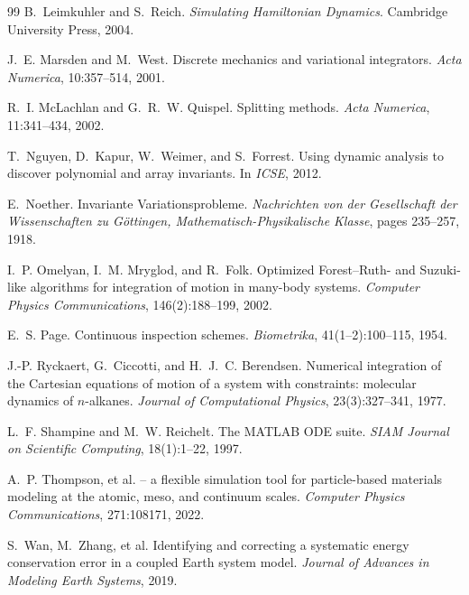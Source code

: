 \documentclass[11pt,a4paper]{article}
\begin{document}
\begin{thebibliography}{99}
B.~Leimkuhler and S.~Reich.
\newblock \emph{Simulating Hamiltonian Dynamics}.
\newblock Cambridge University Press, 2004.

J.~E. Marsden and M.~West.
\newblock Discrete mechanics and variational integrators.
\newblock \emph{Acta Numerica}, 10:357--514, 2001.

R.~I. McLachlan and G.~R.~W. Quispel.
\newblock Splitting methods.
\newblock \emph{Acta Numerica}, 11:341--434, 2002.

T.~Nguyen, D.~Kapur, W.~Weimer, and S.~Forrest.
\newblock Using dynamic analysis to discover polynomial and array invariants.
\newblock In \emph{ICSE}, 2012.

E.~Noether.
\newblock Invariante {V}ariationsprobleme.
\newblock \emph{Nachrichten von der Gesellschaft der Wissenschaften zu G\"ottingen, Mathematisch-Physikalische Klasse}, pages 235--257, 1918.

I.~P. Omelyan, I.~M. Mryglod, and R.~Folk.
\newblock Optimized {Forest--Ruth-} and {Suzuki}-like algorithms for integration of motion in many-body systems.
\newblock \emph{Computer Physics Communications}, 146(2):188--199, 2002.

E.~S. Page.
\newblock Continuous inspection schemes.
\newblock \emph{Biometrika}, 41(1--2):100--115, 1954.

J.-P. Ryckaert, G.~Ciccotti, and H.~J.~C. Berendsen.
\newblock Numerical integration of the {Cartesian} equations of motion of a system with constraints: molecular dynamics of $n$-alkanes.
\newblock \emph{Journal of Computational Physics}, 23(3):327--341, 1977.

L.~F. Shampine and M.~W. Reichelt.
\newblock The {MATLAB} {ODE} suite.
\newblock \emph{SIAM Journal on Scientific Computing}, 18(1):1--22, 1997.

A.~P. Thompson, et al.
 -- a flexible simulation tool for particle-based materials modeling at the atomic, meso, and continuum scales.
\newblock \emph{Computer Physics Communications}, 271:108171, 2022.

S.~Wan, M.~Zhang, et al.
\newblock Identifying and correcting a systematic energy conservation error in a coupled {E}arth system model.
\newblock \emph{Journal of Advances in Modeling Earth Systems}, 2019.


\end{thebibliography}
\end{document}
